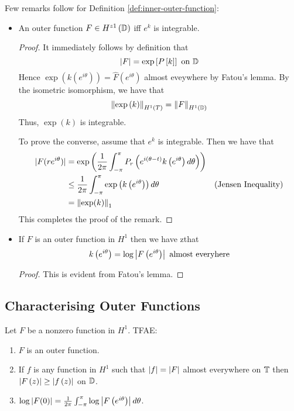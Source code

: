 \begin{remark}
    Few remarks follow for Definition \ref{def:inner-outer-function}:
    \begin{itemize}
	\item An outer function $F \in H^{z1} \left( \mathbb D \right)$ iff $e^{k}$ is integrable.
	    \begin{proof}
	It immediately follows by definition that
	\begin{equation*}
	    \left\lvert F \right\rvert = \exp \left[ P\left[ k \right] \right] \text{ on } \mathbb D
	\end{equation*}
	Hence $\exp(k\left( e^{i\theta} \right)) = \hat{F}\left( e^{i\theta} \right)$ almost eveywhere by Fatou's lemma. By the isometric isomorphism, we have that
	\begin{equation*}
	    \left\lVert \exp\left( k \right) \right\rVert_{H^{1}\left( T \right)} = \left\lVert F \right\rVert_{H^{1} \left( \mathbb D \right)}
	\end{equation*}
	Thus, $\exp \left( k \right)$ is integrable.

	To prove the converse, assume that $e^{k}$ is integrable. Then we have that 
	\begin{align*}
	    |F(re^{i\theta})| &= \exp \left( \frac{1}{2\pi} \int_{-\pi}^{\pi} P_{r} \left( e^{i(\theta-t)} k\left( e^{i\theta} \right) d\theta \right) \right) \\
		&\le \frac{1}{2\pi} \int_{-\pi}^{\pi} \exp \left( k\left( e^{i\theta} \right) \right)  d\theta & \text{(Jensen Inequality)} \\
		&= \left\lVert \exp(k) \right\rVert_{1}
	\end{align*}
	This completes the proof of the remark.
	    \end{proof}
	\item If $F$ is an outer function in $H^{1}$ then we have zthat 
	    \begin{equation*}
		k\left( e^{i\theta} \right) = \log \left\lvert F\left( e^{i\theta} \right) \right\rvert \text{ almost everyhere}
	    \end{equation*}
	    \begin{proof}
		This is evident from Fatou's lemma.
	    \end{proof}
    \end{itemize}
    \label{rem:outer-function}
\end{remark}

\subsection{Characterising Outer Functions}
\begin{theorem}
Let $F$ be a nonzero function in $H^{1}$. TFAE:
\begin{enumerate}[label=(\roman*)]
    \item $F$ is an outer function.
    \item If $f$ is any function in $H^{1}$ such that $\left\lvert f \right\rvert=\left\lvert F \right\rvert$ almost everywhere on $\mathbb T$ then $\left\lvert F\left( z \right) \right\rvert\ge \left\lvert f\left( z \right) \right\rvert$ on $\mathbb D$.
    \item $\log \left\lvert F(0) \right\rvert = \frac{1}{2\pi} \int_{-\pi}^{\pi} \log \left\lvert F\left( e^{i\theta} \right) \right\rvert d\theta$.
\end{enumerate}
    \label{thm:classification-outer-functions}
\end{theorem}

